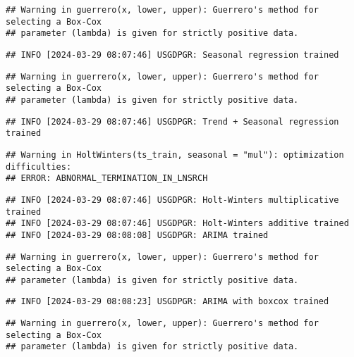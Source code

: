 \documentclass[
]{article}
\begin{document}
\begin{verbatim}
## Warning in guerrero(x, lower, upper): Guerrero's method for selecting a Box-Cox
## parameter (lambda) is given for strictly positive data.
\end{verbatim}

\begin{verbatim}
## INFO [2024-03-29 08:07:46] USGDPGR: Seasonal regression trained
\end{verbatim}

\begin{verbatim}
## Warning in guerrero(x, lower, upper): Guerrero's method for selecting a Box-Cox
## parameter (lambda) is given for strictly positive data.
\end{verbatim}

\begin{verbatim}
## INFO [2024-03-29 08:07:46] USGDPGR: Trend + Seasonal regression trained
\end{verbatim}

\begin{verbatim}
## Warning in HoltWinters(ts_train, seasonal = "mul"): optimization difficulties:
## ERROR: ABNORMAL_TERMINATION_IN_LNSRCH
\end{verbatim}

\begin{verbatim}
## INFO [2024-03-29 08:07:46] USGDPGR: Holt-Winters multiplicative trained
## INFO [2024-03-29 08:07:46] USGDPGR: Holt-Winters additive trained
## INFO [2024-03-29 08:08:08] USGDPGR: ARIMA trained
\end{verbatim}

\begin{verbatim}
## Warning in guerrero(x, lower, upper): Guerrero's method for selecting a Box-Cox
## parameter (lambda) is given for strictly positive data.
\end{verbatim}

\begin{verbatim}
## INFO [2024-03-29 08:08:23] USGDPGR: ARIMA with boxcox trained
\end{verbatim}

\begin{verbatim}
## Warning in guerrero(x, lower, upper): Guerrero's method for selecting a Box-Cox
## parameter (lambda) is given for strictly positive data.
\end{verbatim}
\end{document}
